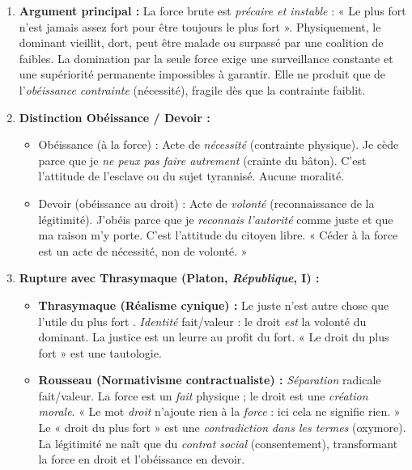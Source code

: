 \documentclass[11pt]{article}
\newcommand{\cle}[1]{{\popxbold\color{popdark}#1}}
\begin{document}
\begin{corrige}
\begin{enumerate}
    \item \textbf{Argument principal :} La force brute est \emph{précaire et instable} : « Le plus fort n'est jamais assez fort pour être toujours le plus fort ». Physiquement, le dominant vieillit, dort, peut être malade ou surpassé par une coalition de faibles. La domination par la seule force exige une surveillance constante et une supériorité permanente impossibles à garantir. Elle ne produit que de l'\emph{obéissance contrainte} (nécessité), fragile dès que la contrainte faiblit.
    \item \textbf{Distinction Obéissance / Devoir :}
    \begin{itemize}
        \item \cle{Obéissance} (à la force) : Acte de \emph{nécessité} (contrainte physique). Je cède parce que je \emph{ne peux pas faire autrement} (crainte du bâton). C'est l'attitude de l'esclave ou du sujet tyrannisé. Aucune moralité.
        \item \cle{Devoir} (obéissance au droit) : Acte de \emph{volonté} (reconnaissance de la légitimité). J'obéis parce que je \emph{reconnais l'autorité} comme juste et que ma raison m'y porte. C'est l'attitude du citoyen libre. « Céder à la force est un acte de nécessité, non de volonté. »
    \end{itemize}
    \item \textbf{Rupture avec Thrasymaque (Platon, \emph{République}, I) :}
    \begin{itemize}
        \item \textbf{Thrasymaque (Réalisme cynique) :} \guillemotleft Le juste n'est autre chose que l'utile du plus fort \guillemotright. \emph{Identité} fait/valeur : le droit \emph{est} la volonté du dominant. La justice est un leurre au profit du fort. « Le droit du plus fort » est une tautologie.
        \item \textbf{Rousseau (Normativisme contractualiste) :} \emph{Séparation} radicale fait/valeur. La force est un \emph{fait} physique ; le droit est une \emph{création morale}. « Le mot \emph{droit} n'ajoute rien à la \emph{force} : ici cela ne signifie rien. » Le « droit du plus fort » est une \emph{contradiction dans les termes} (oxymore). La légitimité ne naît que du \emph{contrat social} (consentement), transformant la force en droit et l'obéissance en devoir.
    \end{itemize}
\end{enumerate}
\end{corrige}
\end{document}

